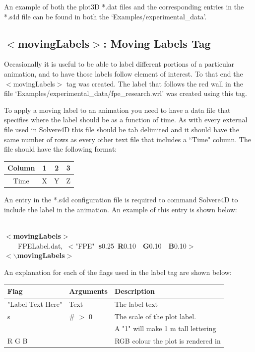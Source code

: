 \documentclass[singlecolumn,12pt]{article}
\newcommand{\hlstd}[1]{\textcolor[rgb]{0,0,0}{#1}}
\newcommand{\hlkey}[1]{\textcolor[rgb]{0,0,1}{\bf{#1}}}
\newcommand{\hlnum}[1]{\textcolor[rgb]{0.66,0,0.66}{#1}}
\newcommand{\hlstr}[1]{\textcolor[rgb]{1,0,0}{#1}}
\begin{document}
An example of both the plot3D *.dat files and the corresponding
entries in the *.s4d file can be found in both the
`Examples/experimental\_data'.

\subsection{$<$movingLabels$>$: Moving Labels Tag}

Occasionally it is useful to be able to label different portions of
a particular animation, and to have those labels follow element of
interest. To that end the $<$movingLabels$>$ tag was created. The
label that follows the red wall in the file
`Examples/experimental\_data/fpe\_research.wrl' was created using
this tag.

To apply a moving label to an animation you need to have a data file
that specifies where the label should be as a function of time. As
with every external file used in Solvere4D this file should be tab
delimited and it should have the same number of rows as every other
text file that includes a ``Time" column. The file should have the
following format:

\vspace{1cm}
\begin{center}
\begin{tabular}{c|c|c|c|}
\hline Column & 1 & 2 & 3 \\
\hline  Time & X & Y & Z \\
\end{tabular}
\end{center}
\vspace{1cm}

An entry in the *.s4d configuration file is required to command
Solvere4D to include the label in the animation. An example of this
entry is shown below:

\vspace{1cm}
\hlstd{\\
}\hlkey{$<$movingLabels$>$}\hlstd{\\
\hlstd{\ \ \ \ }FPELabel.dat,\ }\hlkey{$<$}\hlstr{"FPE"}\hlkey{\ s}\hlnum{0.25\ }\hlkey{R}\hlnum{0.10\hlstd{\ \ }}\hlkey{G}\hlnum{0.10\hlstd{\ \ }}\hlkey{B}\hlnum{0.10}\hlkey{$>$}\hlstd{\\
}\hlkey{$<$$\backslash$movingLabels$>$}
\vspace{1cm}

An explanation for each of the flags used in the label tag are shown
below:

\vspace{1cm}
\begin{tabular}{l l l}
\hline Flag & Arguments  & Description \\
\hline "Label Text Here" & Text & The label text \\
s & \# $>$ 0 & The scale of the plot label. \\
& & A "1" will make 1 m tall lettering\\
R G B & & RGB colour the plot is rendered in\\
\end{tabular}
\vspace{1cm}
\end{document}
